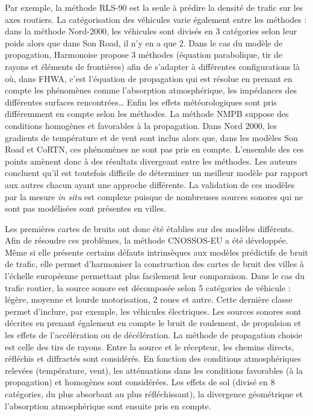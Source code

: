 Par exemple, la méthode RLS-90 est la seule à prédire la densité de trafic sur les axes routiers. La catégorisation des véhicules varie également entre les méthodes : dans la méthode Nord-2000, les véhicules sont divisés en 3 catégories selon leur poids alors que dans Son Road, il n'y en a que 2. Dans le cas du modèle de propagation, Harmonoise propose 3 méthodes (équation parabolique, tir de rayons et éléments de frontières) afin de s'adapter à différentes configurations là où, dans FHWA, c'est l'équation de propagation qui est résolue en prenant en compte les phénomènes comme l'absorption atmosphérique, les impédances des différentes surfaces rencontrées\dots{} Enfin les effets météorologiques sont pris différemment en compte selon les méthodes. La méthode NMPB suppose des conditions homogènes et favorables à la propagation. Dans Nord 2000, les gradients de température et de vent sont inclus alors que, dans les modèles Son Road et CoRTN, ces phénomènes ne sont pas pris en compte. L'ensemble des ces points amènent donc à des résultats divergeant entre les méthodes. 
Les auteurs concluent qu'il est toutefois difficile de déterminer un \og meilleur \fg{} modèle par rapport aux autres chacun ayant une approche différente. La validation de ces modèles par la mesure \textit{in situ} est complexe puisque de nombreuses sources sonores qui ne sont pas modélisées sont présentes en villes. 

Les premières cartes de bruits ont donc été établies sur des modèles différents. 
Afin de résoudre ces problèmes, la méthode CNOSSOS-EU \cite{CNOSSOS,kephalopoulos} a été développée. Même si elle présente certains défauts intrinsèques aux modèles prédictifs de bruit de trafic, elle permet d'harmoniser la construction des cartes de bruit des villes à l'échelle européenne permettant plus facilement leur comparaison. Dans le cas du trafic routier, la source sonore est décomposée selon 5 catégories de véhicule : légère, moyenne et lourde motorisation, 2 roues et autre. Cette dernière classe permet d'inclure, par exemple, les véhicules électriques. Les sources sonores sont décrites en prenant également en compte le bruit de roulement, de propulsion et les effets de l'accélération ou de décélération. 
La méthode de propagation choisie est celle des tirs de rayons. Entre la source et le récepteur, les chemins directs, réfléchis et diffractés sont considérés. En fonction des conditions atmosphériques relevées (température, vent), les atténuations dans les conditions favorables (à la propagation) et homogènes sont considérées. Les effets de sol (divisé en 8 catégories, du plus absorbant au plus réfléchissant), la divergence géométrique et l'absorption atmosphérique sont ensuite pris en compte. 

